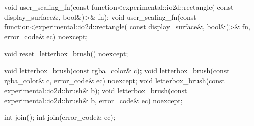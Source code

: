 \begin{itemdecl}
    void user_scaling_fn(const function<experimental::io2d::rectangle(
      const display_surface&, bool&)>& fn);
    void user_scaling_fn(const function<experimental::io2d::rectangle(
      const display_surface&, bool&)>& fn, error_code& ec) noexcept;
\end{itemdecl}
\begin{itemdescr}
	\pnum
	\effects
	
	\pnum
	\postconditions
	
\end{itemdescr}

\begin{itemdecl}
    void reset_letterbox_brush() noexcept;
\end{itemdecl}
\begin{itemdescr}
	\pnum
	\effects
	
	\pnum
	\postconditions
	
\end{itemdescr}

\begin{itemdecl}
    void letterbox_brush(const rgba_color& c);
    void letterbox_brush(const rgba_color& c, error_code& ec) noexcept;
    void letterbox_brush(const experimental::io2d::brush& b);
    void letterbox_brush(const experimental::io2d::brush& b, error_code& ec) noexcept;
\end{itemdecl}
\begin{itemdescr}
	\pnum
	\effects
	
	\pnum
	\postconditions
	
\end{itemdescr}

\begin{itemdecl}
    int join();
    int join(error_code& ec);
\end{itemdecl}
\begin{itemdescr}
	\pnum
	\effects
	
	\pnum
	\postconditions
	
\end{itemdescr}

